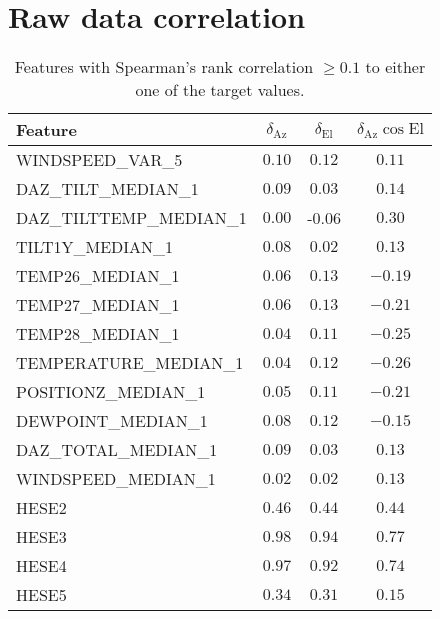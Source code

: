 \section{Raw data correlation}
\begin{table}[!htbp]
    \centering
    \caption{Features with Spearman's rank correlation $\geq 0.1$ to either one of the target values.}
    \begin{tabular}{lccc}
        \toprule
        Feature &  $\delta_{\text{Az}}$ &  $\delta_{\text{El}}$ &  $\delta_{\text{Az}}\cos{\text{El}}$ \\
        \midrule
        WINDSPEED\_VAR\_5        &      $0.10$ &      $0.12$ &               $0.11$ \\
        DAZ\_TILT\_MEDIAN\_1      &      $0.09$ &      $0.03$ &               $0.14$ \\
        DAZ\_TILTTEMP\_MEDIAN\_1  &      $0.00$ &     -$0.06$ &               $0.30$ \\
        TILT1Y\_MEDIAN\_1        &      $0.08$ &      $0.02$ &               $0.13$ \\
        TEMP26\_MEDIAN\_1        &      $0.06$ &      $0.13$ &              $-0.19$ \\
        TEMP27\_MEDIAN\_1        &      $0.06$ &      $0.13$ &              $-0.21$ \\
        TEMP28\_MEDIAN\_1        &      $0.04$ &      $0.11$ &              $-0.25$ \\
        TEMPERATURE\_MEDIAN\_1   &      $0.04$ &      $0.12$ &              $-0.26$ \\
        POSITIONZ\_MEDIAN\_1     &      $0.05$ &      $0.11$ &              $-0.21$ \\
        DEWPOINT\_MEDIAN\_1      &      $0.08$ &      $0.12$ &              $-0.15$ \\
        DAZ\_TOTAL\_MEDIAN\_1     &      $0.09$ &      $0.03$ &               $0.13$ \\
        WINDSPEED\_MEDIAN\_1     &      $0.02$ &      $0.02$ &               $0.13$ \\
        HESE2                  &      $0.46$ &      $0.44$ &               $0.44$ \\
        HESE3                  &      $0.98$ &      $0.94$ &               $0.77$ \\
        HESE4                  &      $0.97$ &      $0.92$ &               $0.74$ \\
        HESE5                  &      $0.34$ &      $0.31$ &               $0.15$ \\

\end{tabular}
\end{table}
